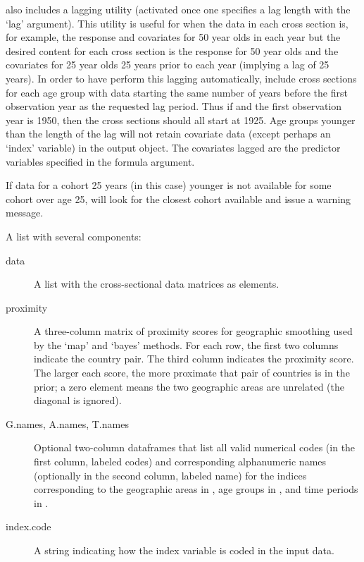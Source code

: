 \begin{Details}
 also includes a lagging utility (activated once
one specifies a lag length with the `lag' argument). This
utility is useful for when the data in each cross section is, for
example, the response and covariates for 50 year olds in each year
but the desired content for each cross section is the response for
50 year olds and the covariates for 25 year olds 25 years prior to
each year (implying a lag of 25 years). In order to have
 perform this lagging automatically, include cross
sections for each age group with data starting the same number of
years before the first observation year as the requested lag
period. Thus if  and the first observation year is
1950, then the cross sections should all start at 1925. Age groups
younger than the length of the lag will not retain covariate data
(except perhaps an `index' variable) in the output
object. The covariates lagged are the predictor variables specified
in the formula argument.

If data for a cohort 25 years (in this case) younger is not
available for some cohort over age 25,  will look
for the closest cohort available and issue a warning message. 

\end{Details}
%
\begin{Value}
\begin{ldescription}
\item[\code{dataobj}] A list with several components:

\begin{description}
 

\item[data] A list with the cross-sectional data matrices as elements.

\item[proximity] A three-column matrix of proximity scores for geographic smoothing used by the `map'
and `bayes' methods. For each row, the first two columns indicate the country pair. The third column indicates the proximity score. The larger each score, the more
proximate that pair of countries is in the prior; a zero element means
the two geographic areas are unrelated (the diagonal is ignored).

\item[G.names, A.names, T.names] Optional two-column dataframes that
list all valid numerical codes (in the first column, labeled codes)
and corresponding alphanumeric names (optionally in the second
column, labeled name) for the indices corresponding to the geographic
areas in , age groups in , and time
periods in .

\item[index.code] A string indicating how the index variable is coded
in the input data.
\end{description}
\end{ldescription}
\end{Value}
